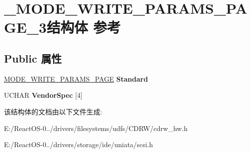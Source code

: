\hypertarget{struct___m_o_d_e___w_r_i_t_e___p_a_r_a_m_s___p_a_g_e__3}{}\section{\+\_\+\+M\+O\+D\+E\+\_\+\+W\+R\+I\+T\+E\+\_\+\+P\+A\+R\+A\+M\+S\+\_\+\+P\+A\+G\+E\+\_\+3结构体 参考}
\label{struct___m_o_d_e___w_r_i_t_e___p_a_r_a_m_s___p_a_g_e__3}
\subsection*{Public 属性}
\begin{DoxyCompactItemize}
\item 
\mbox{\label{struct___m_o_d_e___w_r_i_t_e___p_a_r_a_m_s___p_a_g_e__3_a9c46c0de23b949747fabb3f671409bf7}} 
\hyperlink{struct___m_o_d_e___w_r_i_t_e___p_a_r_a_m_s___p_a_g_e}{M\+O\+D\+E\+\_\+\+W\+R\+I\+T\+E\+\_\+\+P\+A\+R\+A\+M\+S\+\_\+\+P\+A\+GE} {\bfseries Standard}
\item 
\mbox{\label{struct___m_o_d_e___w_r_i_t_e___p_a_r_a_m_s___p_a_g_e__3_ab31784a629a4dc1231b6b664e9a83377}} 
U\+C\+H\+AR {\bfseries Vendor\+Spec} \mbox{[}4\mbox{]}
\end{DoxyCompactItemize}


该结构体的文档由以下文件生成\+:\begin{DoxyCompactItemize}
\item 
E\+:/\+React\+O\+S-\/0../drivers/filesystems/udfs/\+C\+D\+R\+W/cdrw\+\_\+hw.\+h\item 
E\+:/\+React\+O\+S-\/0../drivers/storage/ide/uniata/scsi.\+h\end{DoxyCompactItemize}
